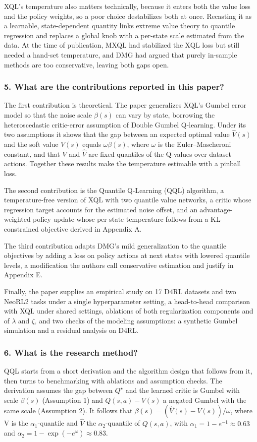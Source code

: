 \documentclass[11pt]{article}
\newcommand{\question}[1]{\subsubsection*{#1}}
\begin{document}
XQL's temperature also matters technically, because it enters both the value loss and the policy weights, so a poor choice destabilizes both at once. Recasting it as a learnable, state-dependent quantity links extreme value theory to quantile regression and replaces a global knob with a per-state scale estimated from the data. At the time of publication, MXQL had stabilized the XQL loss but still needed a hand-set temperature, and DMG had argued that purely in-sample methods are too conservative, leaving both gaps open.

\question{5. What are the contributions reported in this paper?}

The first contribution is theoretical. The paper generalizes XQL's Gumbel error model so that the noise scale $\beta(s)$ can vary by state, borrowing the heteroscedastic critic-error assumption of Double Gumbel Q-learning. Under its two assumptions it shows that the gap between an expected optimal value $\hat{V}(s)$ and the soft value $V(s)$ equals $\omega\beta(s)$, where \ensuremath{\omega} is the Euler--Mascheroni constant, and that $V$ and $\hat{V}$ are fixed quantiles of the Q-values over dataset actions. Together these results make the temperature estimable with a pinball loss.

The second contribution is the Quantile Q-Learning (QQL) algorithm, a temperature-free version of XQL with two quantile value networks, a critic whose regression target accounts for the estimated noise offset, and an advantage-weighted policy update whose per-state temperature follows from a KL-constrained objective derived in Appendix A.

The third contribution adapts DMG's mild generalization to the quantile objectives by adding a loss on policy actions at next states with lowered quantile levels, a modification the authors call conservative estimation and justify in Appendix E.

Finally, the paper supplies an empirical study on 17 D4RL datasets and two NeoRL2 tasks under a single hyperparameter setting, a head-to-head comparison with XQL under shared settings, ablations of both regularization components and of \ensuremath{\lambda} and \ensuremath{\zeta}, and two checks of the modeling assumptions: a synthetic Gumbel simulation and a residual analysis on D4RL.

\question{6. What is the research method?}

QQL starts from a short derivation and the algorithm design that follows from it, then turns to benchmarking with ablations and assumption checks. The derivation assumes the gap between $Q^{\star}$ and the learned critic is Gumbel with scale $\beta(s)$ (Assumption 1) and $Q(s,a)-V(s)$ a negated Gumbel with the same scale (Assumption 2). It follows that $\beta(s) = (\hat{V}(s) - V(s))/\omega$, where V is the $\alpha_{1}$-quantile and $\hat{V}$ the $\alpha_{2}$-quantile of $Q(s,a)$, with $\alpha_1 = 1 - e^{-1} \approx 0.63$ and $\alpha_2 = 1 - \exp(-e^{\omega}) \approx 0.83$.
\end{document}
